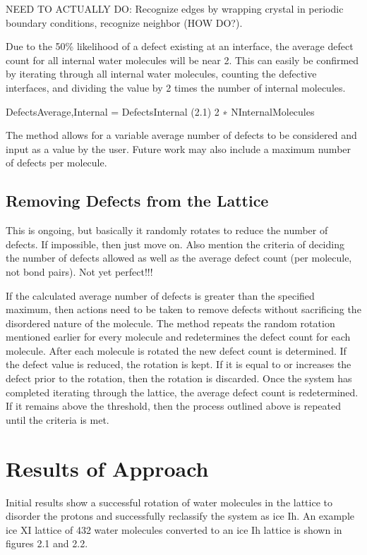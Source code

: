 NEED TO ACTUALLY DO: Recognize edges by wrapping crystal in periodic boundary conditions, recognize neighbor (HOW DO?).

Due to the 50\% likelihood of a defect existing at an interface, the average defect count for all internal water molecules will be near 2. 
This can easily be confirmed by iterating through all internal water molecules, counting the defective interfaces, and dividing the value by 2 times the number of internal molecules.

DefectsAverage,Internal = DefectsInternal (2.1) 2 ∗ NInternalMolecules

The method allows for a variable average number of defects to be considered and input as a value by the user. Future work may also include a maximum number of defects per molecule.

\subsection{Removing Defects from the Lattice}
This is ongoing, but basically it randomly rotates to reduce the number of defects. 
If impossible, then just move on. 
Also mention the criteria of deciding the number of defects allowed as well as the average defect count (per molecule, not bond pairs). 
Not yet perfect!!!

If the calculated average number of defects is greater than the specified maximum, then actions need to be taken to remove defects without sacrificing the disordered nature of the molecule. 
The method repeats the random rotation mentioned earlier for every molecule and redetermines the defect count for each molecule. 
After each molecule is rotated the new defect count is determined. 
If the defect value is reduced, the rotation is kept. 
If it is equal to or increases the defect prior to the rotation, then the rotation is discarded. 
Once the system has completed iterating through the lattice, the average defect count is redetermined. 
If it remains above the threshold, then the process outlined above is repeated until the criteria is met.

\section{Results of Approach}
Initial results show a successful rotation of water molecules in the lattice to disorder the protons and successfully reclassify the system as ice Ih. 
An example ice XI lattice of 432 water molecules converted to an ice Ih lattice is shown in figures 2.1 and 2.2.

